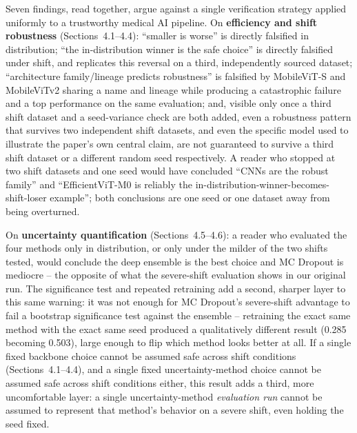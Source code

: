 \documentclass[runningheads]{llncs}
\begin{document}
Seven findings, read together, argue against a single verification
strategy applied uniformly to a trustworthy medical AI pipeline. On
\textbf{efficiency and shift robustness} (Sections~4.1--4.4): ``smaller is
worse'' is directly falsified in distribution; ``the in-distribution
winner is the safe choice'' is directly falsified under shift, and
replicates this reversal on a third, independently sourced dataset;
``architecture family/lineage predicts robustness'' is falsified by
MobileViT-S and MobileViTv2 sharing a name and lineage while producing a
catastrophic failure and a top performance on the same evaluation; and,
visible only once a third shift dataset and a seed-variance check are
both added, even a robustness pattern that survives two independent shift
datasets, and even the specific model used to illustrate the paper's own
central claim, are not guaranteed to survive a third shift dataset or a
different random seed respectively. A reader who stopped at two shift
datasets and one seed would have concluded ``CNNs are the robust family''
and ``EfficientViT-M0 is reliably the in-distribution-winner-becomes-
shift-loser example''; both conclusions are one seed or one dataset away
from being overturned.

On \textbf{uncertainty quantification} (Sections~4.5--4.6): a reader who
evaluated the four methods only in distribution, or only under the milder
of the two shifts tested, would conclude the deep ensemble is the best
choice and MC Dropout is mediocre -- the opposite of what the severe-shift
evaluation shows in our original run. The significance test and repeated
retraining add a second, sharper layer to this same warning: it was not
enough for MC Dropout's severe-shift advantage to fail a bootstrap
significance test against the ensemble -- retraining the exact same
method with the exact same seed produced a qualitatively different result
(0.285 becoming 0.503), large enough to flip which method looks better at
all. If a single fixed backbone choice cannot be assumed safe across
shift conditions (Sections~4.1--4.4), and a single fixed uncertainty-method
choice cannot be assumed safe across shift conditions either, this result
adds a third, more uncomfortable layer: a single uncertainty-method
\emph{evaluation run} cannot be assumed to represent that method's
behavior on a severe shift, even holding the seed fixed.
\end{document}
